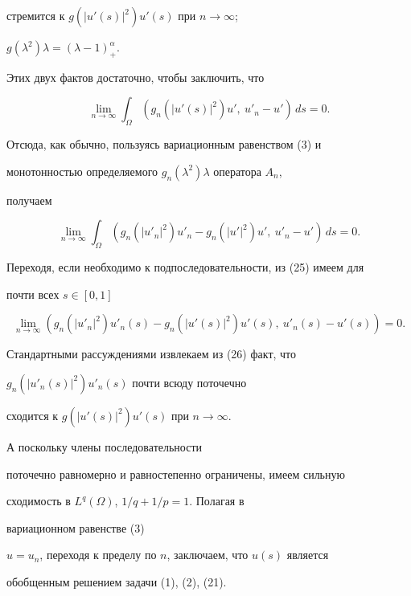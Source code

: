 \begin{pf}
стремится к $g(|u'(s)|^2)u'(s)$ при $n\to\infty$; 


$g(\lambda^2)\lambda=(\lambda-1)^\alpha_+$. 


Этих двух фактов достаточно, чтобы заключить, что 


$$ 


\lim_{n\to\infty}\int_\Omega(g_n(|u'(s)|^2)u',\ u'_n- 


u')\,ds=0. 


$$ 


Отсюда, как обычно, пользуясь вариационным равенством (3) и 


монотонностью определяемого $g_n(\lambda^2)\lambda$ оператора $A_n$, 


получаем 


\begin{equation} 


\lim_{n\to\infty}\int_\Omega 


(g_n(|u'_n|^2)u'_n-g_n 


(|u'|^2)u',\ u'_n-u')\,ds=0. 


\end{equation} 


Переходя, если необходимо к подпоследовательности, из (25) имеем для 


почти всех $s\in[0,1]$ 


\begin{equation} 


\lim_{n\to\infty}(g_n(|u'_n|^2)u'_n(s)- 


g_n(|u'(s)|^2)u'(s),\ u'_n(s)-u'(s))=0. 


\end{equation} 


Стандартными рассуждениями извлекаем из (26) факт, что 


$g_n(|u'_n(s)|^2)u'_n(s)$ почти всюду поточечно 


сходится к $g(|u'(s)|^2)u'(s)$ при $n\to\infty$. 


А поскольку члены последовательности 


поточечно равномерно и равностепенно ограничены, имеем сильную 


сходимость в $L^q(\Omega)$, $1/q+1/p=1$. Полагая в


вариационном равенстве (3)


$u=u_n$, переходя к пределу по $n$, заключаем, что $u(s)$ является 


обобщенным решением задачи (1), (2), (21). 


\end{pf} 


